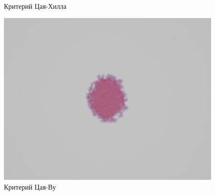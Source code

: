 \documentclass[xcolor={usenames,dvipsnames,svgnames,table}]{beamer}
\begin{document}
\begin{frame}
\begin{center}
\begin{minipage}[h]{0.30\textwidth}
\begin{figure}[h]
                \tiny
                \caption{Критерий Цая-Хилла}
            \end{figure}
        \end{minipage}
        \begin{minipage}[h]{0.30\textwidth}
            \begin{figure}[h]
                \includegraphics[width=\textwidth]{png/3-stringer-panel/cover-tsai-wu.png}
                \tiny
                \caption{Критерий Цая-Ву}
            \end{figure}
        \end{minipage}
    \end{center}
\end{frame}
\end{document}
